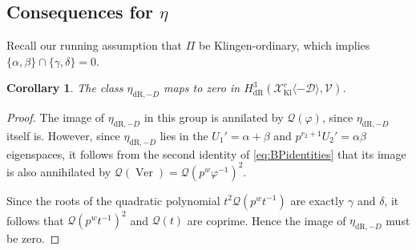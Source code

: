 \documentclass[cjm]{ipart}
\theoremstyle{plain}
\newtheorem{proposition}[theorem]{Proposition}
\newtheorem{corollary}[theorem]{Corollary}
\theoremstyle{remark}
\DeclareMathOperator{\Iw}{Iw}
\DeclareMathOperator{\Kl}{Kl}
\newcommand{\cD}{\mathcal{D}}
\newcommand{\cQ}{\mathcal{Q}}
\newcommand{\cV}{\mathcal{V}}
\newcommand{\cX}{\mathcal{X}}
\newcommand{\dR}{\mathrm{dR}}
\newcommand{\res}{\mathrm{res}}
\numberwithin{equation}{subsection}
\begin{document}
%
%

 \subsection{Consequences for $\eta$}

  Recall our running assumption that $\Pi$ be Klingen-ordinary, which implies $\{ \alpha, \beta\} \cap \{ \gamma, \delta\} = 0$.

  \begin{corollary}
   The class $\eta_{\dR,-D}$ maps to zero in $H^3_{\dR}(\cX_{\Kl}^e\langle -\cD\rangle,\cV)$.
  \end{corollary}

  \begin{proof}
   The image of $\eta_{\dR, -D}$ in this group is annilated by $\cQ(\varphi)$, since $\eta_{\dR, -D}$ itself is. However, since $\eta_{\dR, -D}$ lies in the $U_1' = \alpha + \beta$ and $p^{r_2 + 1} U_2' = \alpha \beta$ eigenspaces, it follows from the second identity of \cref{eq:BPidentities} that its image is also annihilated by $\cQ(\operatorname{Ver}) =\cQ(p^w \varphi^{-1})^2$.

   Since the roots of the quadratic polynomial $t^2\cQ(p^w t^{-1})$ are exactly $\gamma$ and $\delta$, it follows that $\cQ(p^w t^{-1})^2$ and $\cQ(t)$ are coprime. Hence the image of $\eta_{\dR, -D}$ must be zero.
  \end{proof}
\end{document}
